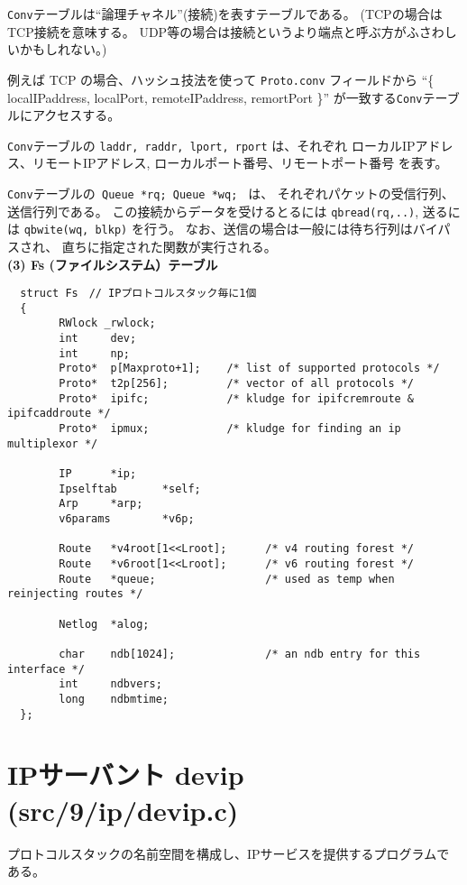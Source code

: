 {\tt Conv}テーブルは``論理チャネル''(接続)を表すテーブルである。
(TCPの場合はTCP接続を意味する。
UDP等の場合は接続というより端点と呼ぶ方がふさわしいかもしれない。)


例えば TCP の場合、ハッシュ技法を使って \verb|Proto.conv| フィールドから
 ``\{ localIPaddress, localPort, remoteIPaddress, remortPort \}''
が一致する{\tt Conv}テーブルにアクセスする。


{\tt Conv}テーブルの \verb|laddr, raddr, lport, rport| は、それぞれ
ローカルIPアドレス、リモートIPアドレス, ローカルポート番号、リモートポート番号
を表す。

{\tt Conv}テーブルの\verb| Queue *rq; Queue *wq; | は、
それぞれパケットの受信行列、送信行列である。
この接続からデータを受けるとるには \verb|qbread(rq,..)|,
送るには \verb|qbwite(wq, blkp)| を行う。
なお、送信の場合は一般には待ち行列はバイパスされ、
直ちに指定された関数が実行される。
\\

{\bf \flushleft(3) Fs (ファイルシステム）テーブル}

{\footnotesize
\begin{verbatim}
  struct Fs　// IPプロトコルスタック毎に1個
  {
        RWlock _rwlock;    
        int     dev;
        int     np;
        Proto*  p[Maxproto+1];    /* list of supported protocols */
        Proto*  t2p[256];         /* vector of all protocols */
        Proto*  ipifc;            /* kludge for ipifcremroute & ipifcaddroute */
        Proto*  ipmux;            /* kludge for finding an ip multiplexor */

        IP      *ip;
        Ipselftab       *self;
        Arp     *arp;
        v6params        *v6p;

        Route   *v4root[1<<Lroot];      /* v4 routing forest */
        Route   *v6root[1<<Lroot];      /* v6 routing forest */
        Route   *queue;                 /* used as temp when reinjecting routes */

        Netlog  *alog;

        char    ndb[1024];              /* an ndb entry for this interface */
        int     ndbvers;
        long    ndbmtime;
  };
\end{verbatim}
}



\section{IPサーバント devip (src/9/ip/devip.c)}


プロトコルスタックの名前空間を構成し、IPサービスを提供するプログラムである。

